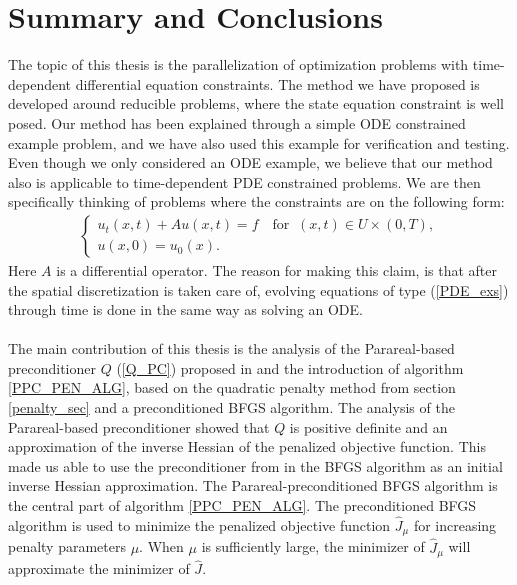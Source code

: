\chapter{Summary and Conclusions} \label{summary chap}
The topic of this thesis is the parallelization of optimization problems with time-dependent differential equation constraints. The method we have proposed is developed around reducible problems, where the state equation constraint is well posed. Our method has been explained through a simple ODE constrained example problem, and we have also used this example for verification and testing. Even though we only considered an ODE example, we believe that our method also is applicable to time-dependent PDE constrained problems. We are then specifically thinking of problems where the constraints are on the following form:
\begin{align}
\left\{
     \begin{array}{lr}
       	u_t(x,t) + Au(x,t)=f \quad \textrm{for } \ (x,t)\in U\times(0,T),\\
       	u(x,0)=u_0(x).
     \end{array}
   \right. \label{PDE_exs}
\end{align}
Here $A$ is a differential operator. The reason for making this claim, is that after the spatial discretization is taken care of, evolving equations of type (\ref{PDE_exs}) through time is done in the same way as solving an ODE. 
\\
\\
The main contribution of this thesis is the analysis of the Parareal-based preconditioner $Q$ (\ref{Q_PC}) proposed in \cite{maday2002parareal} and the introduction of algorithm \ref{PPC_PEN_ALG}, based on the quadratic penalty method from section \ref{penalty_sec} and a preconditioned BFGS algorithm. The analysis of the Parareal-based preconditioner showed that $Q$ is positive definite and an approximation of the inverse Hessian of the penalized objective function. This made us able to use the preconditioner from \cite{maday2002parareal} in the BFGS algorithm as an initial inverse Hessian approximation. The Parareal-preconditioned BFGS algorithm is the central part of algorithm \ref{PPC_PEN_ALG}. The preconditioned BFGS algorithm is used to minimize the penalized objective function $\hat J_{\mu}$ for increasing penalty parameters $\mu$. When $\mu$ is sufficiently large, the minimizer of $\hat J_{\mu}$ will approximate the minimizer of $\hat J$.
\\
\\

